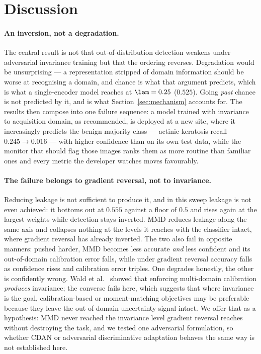\section{Discussion}

\paragraph{An inversion, not a degradation.}
The central result is not that out-of-distribution detection weakens under adversarial
invariance training but that the ordering reverses. Degradation would be unsurprising
--- a representation stripped of domain information should be worse at recognising a
domain, and chance is what that argument predicts, which is what a single-encoder model
reaches at $\lam = 0.25$ ($0.525$). Going \emph{past} chance is not predicted by it,
and is what Section~\ref{sec:mechanism} accounts for. The results then compose into one
failure sequence: a model trained with invariance to acquisition domain, as
recommended, is deployed at a new site, where it increasingly predicts the benign
majority class --- actinic keratosis recall $0.245 \to 0.016$ --- with higher
confidence than on its own test data, while the monitor that should flag those images
ranks them as more routine than familiar ones and every metric the developer watches
moves favourably.

\paragraph{The failure belongs to gradient reversal, not to invariance.}
Reducing leakage is not sufficient to produce it, and in this sweep leakage is not even
achieved: it bottoms out at $0.555$ against a floor of $0.5$ and rises again at the
largest weights while detection stays inverted. MMD reduces leakage along the same axis
and collapses nothing at the levels it reaches with the classifier intact, where
gradient reversal has already inverted. The two also fail in opposite manners: pushed
harder, MMD becomes less accurate \emph{and} less confident and its out-of-domain
calibration error falls, while under gradient reversal accuracy falls as confidence
rises and calibration error triples. One degrades honestly, the other is confidently
wrong. Wald et al.~\cite{wald2021} showed that enforcing multi-domain calibration
\emph{produces} invariance; the converse fails here, which suggests that where
invariance is the goal, calibration-based or moment-matching objectives may be
preferable because they leave the out-of-domain uncertainty signal intact. We offer
that as a hypothesis: MMD never reached the invariance level gradient reversal reaches
without destroying the task, and we tested one adversarial formulation, so whether CDAN
or adversarial discriminative adaptation behaves the same way is not established here.

